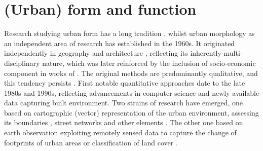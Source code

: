 \section{(Urban) form and function}
\label{sec:lit}




Research studying urban form has a long tradition \citep{geddes1915cities, trewartha1934japanese}, whilst urban morphology as an independent area of research has established in the 1960s. It originated independently in geography \citep{conzen1960alnwick} and architecture \citep{muratori1959studi}, reflecting its inherently multi-disciplinary nature, which was later reinforced by the inclusion of socio-economic component in works of \cite{panerai1997formes}. The original methods are predominantly qualitative, and this tendency persists \citep{dibble2016urban}. First notable quantitative approaches date to the late 1980s and 1990s, reflecting advancements in computer science and newly available data capturing built environment. Two strains of research have emerged, one based on cartographic (vector) representation of the urban environment, assessing its boundaries \citep{batty1987}, street networks \citep{hillier1996, porta2006} and other elements \citep{pivo1993taxonomy}. The other one based on earth observation exploiting remotely sensed data to capture the change of footprints of urban areas \citep{howarth1983landsat} or classification of land cover \citep{europeanenvironmentagency1990}. 

